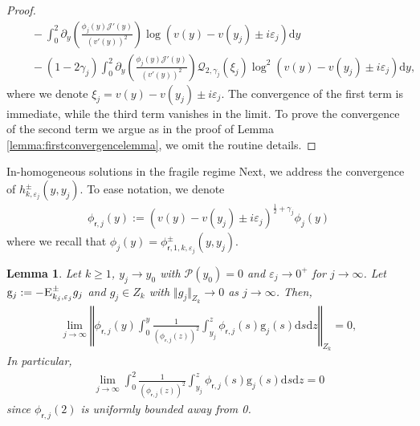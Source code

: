 \documentclass[11pt,reqno]{amsproc}
\makeatletter
\renewcommand\subsection{\@startsection{subsection}{2}%
\normalparindent{.5\linespacing\@plus.7\linespacing}{-.5em}
{\normalfont\bfseries}}
\newtheorem{lemma}[proposition]{Lemma}
\theoremstyle{definition}
\numberwithin{equation}{section}
\newcommand{\cJ}{{\mathcal{J}}}
\newcommand{\sr}{{\mathsf{r}}}
\renewcommand{\d}{\mathrm{d}}
\newcommand{\ep}{\varepsilon}
\renewcommand{\P}{{\mathcal{P}}}
\makeatother
\begin{document}
\begin{proof}
\begin{align*}
&\quad - \int_0^2 \partial_y\left( \frac{\phi_j(y) \cJ'(y)}{(v'(y))^2} \right) \log( v(y) - v(y_j) \pm i\ep_j) \d y \\
&\quad - (1-2\gamma_j)\int_0^2 \partial_y\left( \frac{\phi_j(y) \cJ'(y)}{(v'(y))^2} \right) \mathcal{Q}_{2,\gamma_j}(\xi_j)\log^2( v(y) - v(y_j) \pm i\ep_j) \d y, 
\end{align*}
where we denote $\xi_j=v(y) - v(y_j) \pm i\ep_j$. The convergence of the first term is immediate, while the third term vanishes in the limit. To prove the convergence of the second term we argue as in the proof of Lemma \ref{lemma:firstconvergencelemma}, we omit the routine details.
\end{proof}

\subsection{In-homogeneous solutions in the fragile regime}
Next, we address the convergence of $h_{k,\ep_j}^\pm(y,y_j)$. To ease notation, we denote 
\begin{align*}
\phi_{\sr,j}(y) := (v(y) - v(y_j) \pm i\ep_j)^{\frac12+\gamma_j}\phi_j(y)
\end{align*} 
where we recall that $\phi_j(y)=\phi_{\sr,1,k,\ep_j}^\pm(y,y_j)$.

\begin{lemma}\label{lemma:vanishingfirstinhomsol}
Let $k\geq 1$, $y_j\rightarrow y_0$ with $\P(y_0)=0$ and $\ep_j\rightarrow 0^+$ for $j\rightarrow \infty$. Let $\mathrm{g}_j:=-\textsc{E}_{k_j,\ep_j}^\pm g_j$ and $g_j\in Z_k$ with $\Vert g_j \Vert_{Z_k}\rightarrow 0$ as $j\rightarrow \infty$. Then,
\begin{align*}
\lim_{j\rightarrow \infty}  \left \Vert \phi_{\sr,j}(y) \int_0^y \frac{1}{(\phi_{\sr,j}(z))^2} \int_{y_j}^z \phi_{\sr,j}(s) \mathrm{g}_j(s) \d s \d z \right\Vert_{Z_k} = 0,
\end{align*}
In particular, 
\begin{align*}
\lim_{j\rightarrow \infty} \int_0^2 \frac{1}{(\phi_{\sr,j}(z))^2} \int_{y_j}^z \phi_{\sr,j}(s) \mathrm{g}_j(s) \d s \d z = 0
\end{align*}
since $\phi_{\sr,j}(2)$ is uniformly bounded away from 0.
\end{lemma}
\end{document}
